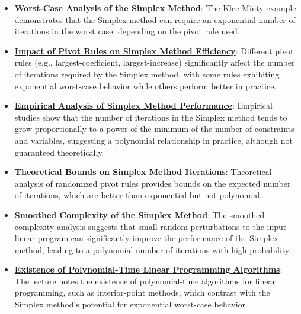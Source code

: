 \documentclass{article}%
\begin{document}
\begin{itemize}[leftmargin=*]%
\item \href{https://www.math.purdue.edu/~yipn/421/2024-09-05-SimplexEfficiency.pdf#page=2}{\textbf{Worst{-}Case Analysis of the Simplex Method}}: The Klee-Minty example demonstrates that the Simplex method can require an exponential number of iterations in the worst case, depending on the pivot rule used.%
\item \href{https://www.math.purdue.edu/~yipn/421/2024-09-05-SimplexEfficiency.pdf#page=3}{\textbf{Impact of Pivot Rules on Simplex Method Efficiency}}: Different pivot rules (e.g., largest-coefficient, largest-increase) significantly affect the number of iterations required by the Simplex method, with some rules exhibiting exponential worst-case behavior while others perform better in practice.%
\item \href{https://www.math.purdue.edu/~yipn/421/2024-09-05-SimplexEfficiency.pdf#page=9}{\textbf{Empirical Analysis of Simplex Method Performance}}: Empirical studies show that the number of iterations in the Simplex method tends to grow proportionally to a power of the minimum of the number of constraints and variables, suggesting a polynomial relationship in practice, although not guaranteed theoretically.%
\item \href{https://www.math.purdue.edu/~yipn/421/2024-09-05-SimplexEfficiency.pdf#page=10}{\textbf{Theoretical Bounds on Simplex Method Iterations}}: Theoretical analysis of randomized pivot rules provides bounds on the expected number of iterations, which are better than exponential but not polynomial.%
\item \href{https://www.math.purdue.edu/~yipn/421/2024-09-05-SimplexEfficiency.pdf#page=11}{\textbf{Smoothed Complexity of the Simplex Method}}: The smoothed complexity analysis suggests that small random perturbations to the input linear program can significantly improve the performance of the Simplex method, leading to a polynomial number of iterations with high probability.%
\item \href{https://www.math.purdue.edu/~yipn/421/2024-09-05-SimplexEfficiency.pdf#page=12}{\textbf{Existence of Polynomial{-}Time Linear Programming Algorithms}}: The lecture notes the existence of polynomial-time algorithms for linear programming, such as interior-point methods, which contrast with the Simplex method's potential for exponential worst-case behavior.%
\end{itemize}%
\end{document}
